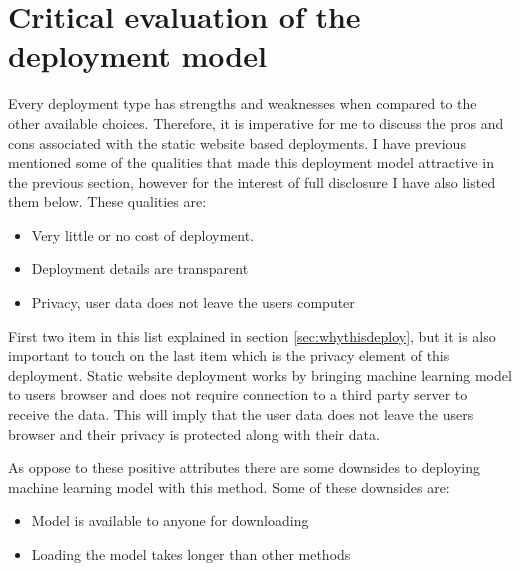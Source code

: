 \section{Critical evaluation of the deployment model}
Every deployment type has strengths and weaknesses when compared to the other available choices.
Therefore, it is imperative for me to discuss the pros and cons associated with the static website based deployments.
I have previous mentioned some of the qualities that made this deployment model attractive in the previous section, however for the interest of full disclosure I have also listed them below.
These qualities are:

\begin{itemize}
    \item Very little or no cost of deployment.
    \item Deployment details are transparent
    \item Privacy, user data does not leave the users computer
\end{itemize}

First two item in this list explained in section \ref{sec:whythisdeploy}, but it is also important to touch on the last item which is the privacy element of this deployment.
Static website deployment works by bringing machine learning model to users browser and does not require connection to a third party server to receive the data.
This will imply that the user data does not leave the users browser and their privacy is protected along with their data.

As oppose to these positive attributes there are some downsides to deploying machine learning model with this method.
Some of these downsides are:

\begin{itemize}
    \item Model is available to anyone for downloading
    \item Loading the model takes longer than other methods
\end{itemize}

